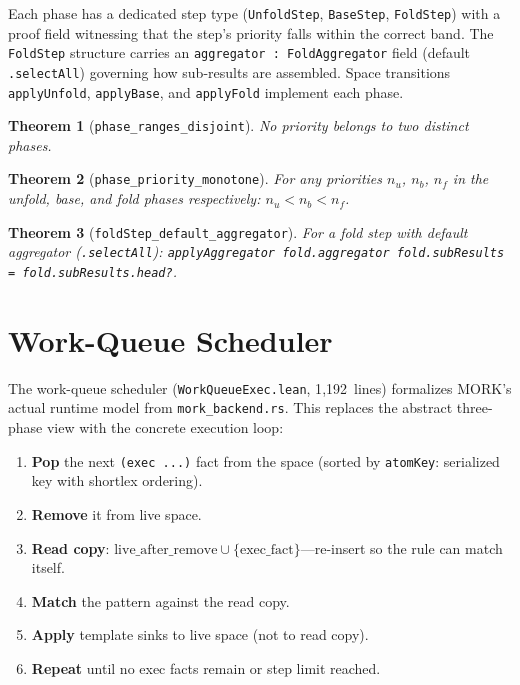 \documentclass[11pt]{article}
\newtheorem{theorem}{Theorem}[section]
\theoremstyle{definition}
\theoremstyle{remark}
\newcommand{\MORK}{\textup{MORK}}
\begin{document}
Each phase has a dedicated step type (\texttt{UnfoldStep}, \texttt{BaseStep},
\texttt{FoldStep}) with a proof field witnessing that the step's priority
falls within the correct band.
The \texttt{FoldStep} structure carries an \texttt{aggregator :
FoldAggregator} field (default \texttt{.selectAll}) governing how
sub-results are assembled.
Space transitions \texttt{applyUnfold}, \texttt{applyBase}, and
\texttt{applyFold} implement each phase.

\begin{theorem}[\texttt{phase\_ranges\_disjoint}]
No priority belongs to two distinct phases.
\end{theorem}

\begin{theorem}[\texttt{phase\_priority\_monotone}]
For any priorities $n_u$, $n_b$, $n_f$ in the unfold, base, and fold
phases respectively: $n_u < n_b < n_f$.
\end{theorem}

\begin{theorem}[\texttt{foldStep\_default\_aggregator}]
For a fold step with default aggregator (\texttt{.selectAll}):
\texttt{applyAggregator fold.aggregator fold.subResults =
fold.subResults.head?}.
\end{theorem}

\section{Work-Queue Scheduler}
\label{sec:workqueue}

The work-queue scheduler (\texttt{WorkQueueExec.lean}, 1{,}192~lines)
formalizes \MORK{}'s actual runtime model from \texttt{mork\_backend.rs}.
This replaces the abstract three-phase view with the concrete execution
loop:

\begin{enumerate}[nosep]
\item \textbf{Pop} the next \texttt{(exec ...)} fact from the space
  (sorted by \texttt{atomKey}: serialized key with shortlex ordering).
\item \textbf{Remove} it from live space.
\item \textbf{Read copy}: $\mathrm{live\_after\_remove} \cup
  \{\mathrm{exec\_fact}\}$---re-insert so the rule can match itself.
\item \textbf{Match} the pattern against the read copy.
\item \textbf{Apply} template sinks to live space (not to read copy).
\item \textbf{Repeat} until no exec facts remain or step limit reached.
\end{enumerate}
\end{document}
